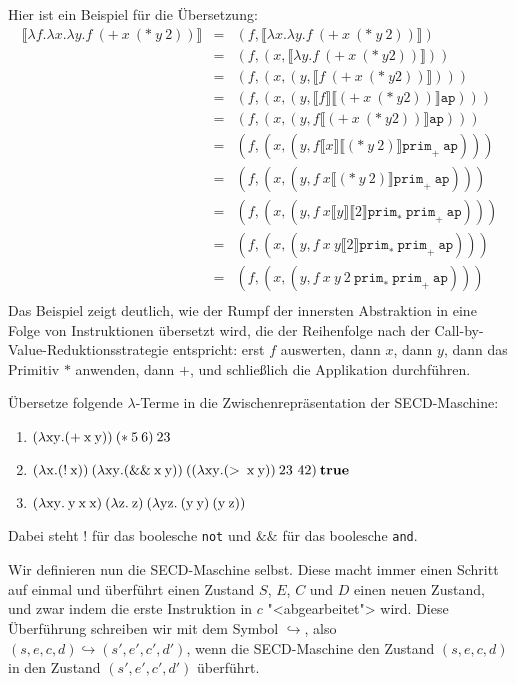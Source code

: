 Hier ist ein Beispiel für die Übersetzung:
%
\begin{eqnarray*}
  \llbracket \lambda f.\lambda x.\lambda y.f~(+~x~(*~y~2))\rrbracket
  &=&
  (f, \llbracket \lambda x.\lambda y.f~(+~x~(*~y~2))\rrbracket)\\
  &=&
  (f, (x, \llbracket \lambda y.f~(+~x~(*~y 2))\rrbracket))\\
  &=&
  (f, (x, (y, \llbracket f~(+~x~(*~y 2))\rrbracket)))\\
  &=&
  (f, (x, (y, \llbracket f\rrbracket \llbracket (+~x~(*~y
  2))\rrbracket \mathtt{ap})))\\
  &=&
  (f, (x, (y, f \llbracket (+~x~(*~y 2))\rrbracket\mathtt{ap})))\\
  &=&
  (f, (x, (y, f \llbracket x\rrbracket \llbracket (*~y~2)\rrbracket \mathtt{prim}_+~\mathtt{ap})))\\
  &=&
  (f, (x, (y, f~x \llbracket (*~y~2)\rrbracket \mathtt{prim}_+~\mathtt{ap})))\\
  &=&
  (f, (x, (y, f~x \llbracket y\rrbracket \llbracket 2\rrbracket \mathtt{prim}_*~\mathtt{prim}_+~\mathtt{ap})))\\
  &=&
  (f, (x, (y, f~x~y \llbracket 2\rrbracket \mathtt{prim}_*~\mathtt{prim}_+~\mathtt{ap})))\\
  &=&
  (f, (x, (y, f~x~y~2~\mathtt{prim}_*~\mathtt{prim}_+~\mathtt{ap})))\\
\end{eqnarray*}
%
Das Beispiel zeigt deutlich, wie der Rumpf der innersten Abstraktion
in eine Folge von Instruktionen übersetzt wird, die der Reihenfolge
nach der Call-by-Value-Reduktionsstrategie entspricht: erst $f$
auswerten, dann $x$, dann $y$, dann das Primitiv $*$ anwenden, dann
$+$, und schließlich die Applikation durchführen.

\begin{aufgabeinline}
  Übersetze folgende $\lambda$-Terme in die Zwischenrepräsentation
  der SECD-Maschine:
  \begin{enumerate}
  \item \((\lambda \mathrm x \mathrm y.(+\:\mathrm x\:\mathrm y))\:(*\:5\:6)\:23\)

  \item \((\lambda \mathrm x.(!\:\mathrm x))\:(\lambda \mathrm x\mathrm
    y.(\&\&\:\mathrm x\:\mathrm y))\:((\lambda \mathrm x\mathrm y.(>\:\mathrm x\:\mathrm
    y))\:23~42)\:\mathbf{true}\)
   
  \item \((\lambda \mathrm x\mathrm y.\:\mathrm y\:\mathrm x\:\mathrm x)\:(\lambda
    \mathrm z.\:\mathrm z)\:(\lambda \mathrm y\mathrm z.\:(\mathrm y\:\mathrm y)\:(\mathrm
    y\:\mathrm z))\)
  \end{enumerate}
  Dabei steht $!$ für das boolesche \lstinline{not} und $\&\&$ für das
  boolesche \lstinline{and}.
\end{aufgabeinline}
%
Wir definieren nun die SECD-Maschine selbst.  Diese macht immer einen
Schritt auf einmal und überführt einen Zustand $S$, $E$, $C$ und $D$
einen neuen Zustand, und zwar indem die erste Instruktion in $c$
"<abgearbeitet"> wird.  Diese Überführung schreiben wir mit dem Symbol
$\hookrightarrow$, also
$(s, e, c, d) \hookrightarrow (s', e', c', d')$, wenn die
SECD-Maschine den Zustand $(s, e, c, d)$ in den Zustand
$(s', e', c', d')$ überführt.


